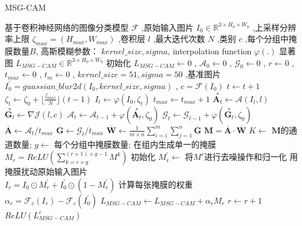  \begin{algorithm}
	\caption{MSG-CAM}
	\label{alg:1}
	\renewcommand{\algorithmicrequire}{\textbf{输入:}}
	\renewcommand{\algorithmicensure}{\textbf{输出:}}
	\begin{algorithmic}[1]
		\REQUIRE 基于卷积神经网络的图像分类模型 $\mathcal{F} $ ,原始输入图片 $I_0 \in \mathbb{R}^{3\times H_0 \times W_0}$ ,上采样分辨率上限 $\zeta_{max}=(H_{max},W_{max})$ ,卷积层 $l$ ,最大迭代次数 $N$ ,类别 $c$ ,每个分组中掩膜数量$B$, 高斯模糊参数： $kernel\_size,sigma$, interpolation function $\varphi(.)$
		\ENSURE 显著图 $L_{MSG-CAM}\in \mathbb{R}^{3\times H_0 \times W_0}$
		\STATE 初始化 $L_{MSG-CAM} \leftarrow 0$ , $\mathcal{A}_0 \leftarrow 0$ , $\mathcal{G}_0 \leftarrow 0$ , $r \leftarrow 0$ , $t_{max}\leftarrow 0$ , $t_m\leftarrow 0$ , $kernel\_size=51,sigma=50$ ,基准图片 $I^{\prime}_0=guassian\_blur2d(I_0,kernel\_size,sigma)$ , $c=\mathcal{F}(I_0)$
		\STATE $t\leftarrow t+1$
		\STATE $\zeta_t\leftarrow \zeta_0 +\lfloor\frac{\zeta_{max}}{N}\rfloor(t-1)$
		\STATE $I_t\leftarrow \varphi(I_0,\zeta_t)$
		\STATE $t_{max}\leftarrow t_{max}+1$
		\STATE $\overset{*}{\boldsymbol{A}_t}\leftarrow \mathcal{A}(I_t,l)$
		\STATE $\overset{*}{\boldsymbol{G}_t}\leftarrow \nabla\mathcal{J}(l,c)$
		\STATE $\mathcal{A}_t \leftarrow \mathcal{A}_{t-1}+\varphi(\overset{*}{\boldsymbol{A}_t},\zeta_0)$
		\STATE $\mathcal{G}_t \leftarrow \mathcal{G}_{t-1}+\varphi(\overset{*}{\boldsymbol{G}_t},\zeta_0)$
		\ENDIF
		\ENDWHILE
		\STATE $\overline{\bm{A}}\leftarrow \mathcal{A}_t/t_{max}$
		\STATE $\overline{\bm{G}}\leftarrow \mathcal{G}_t/t_{max}$
		\STATE $\overline{\bm{W}}\leftarrow \frac{1}{m\times n}\sum_{i=i}^{m}\sum_{j=1}^{n}\overline{\bm{G}}$
		\STATE $\boldsymbol{M}=\overline{\bm{A}}\cdot\overline{\bm{W}}$
		\STATE $K\leftarrow$ $\boldsymbol{M}$的通道数量;
		\STATE $g\leftarrow$ 每个分组中掩膜数量;
		\STATE 在组内生成单一的掩膜\\ $M_r=ReLU(\sum_{k=r\times g}^{(r+1)\times g-1}M^k)$
		\STATE 初始化 $M^{\prime}_r\leftarrow$ 将$M^r$进行去噪操作和归一化
		\STATE 用掩膜扰动原始输入图片\\$I_r=I_0\odot M^{\prime}_r+I^{\prime}_0\odot (1-M^{\prime}_r)$
		\STATE 计算每张掩膜的权重\\$\alpha_r=\mathcal{F}_c(I_r)-\mathcal{F}_c(I^{\prime}_0)$
		\STATE $L_{MSG-CAM}\leftarrow L_{MSG-CAM}+\alpha_r M_r$
		\STATE $r\leftarrow r+1$
		\ENDWHILE
		\RETURN $ReLU(L^c_{MSG-CAM})$
	\end{algorithmic}
\end{algorithm}
